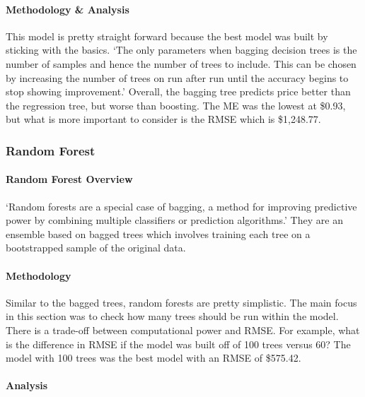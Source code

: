 \documentclass[
  paper=a4,
  ,captions=tableheading
]{scrartcl}
\begin{document}
\hypertarget{methodology-analysis}{%
\paragraph{Methodology \& Analysis}\label{methodology-analysis}}

This model is pretty straight forward because the best model was built
by sticking with the basics. `The only parameters when bagging decision
trees is the number of samples and hence the number of trees to include.
This can be chosen by increasing the number of trees on run after run
until the accuracy begins to stop showing improvement.' Overall, the
bagging tree predicts price better than the regression tree, but worse
than boosting. The ME was the lowest at \$0.93, but what is more
important to consider is the RMSE which is \$1,248.77.

\hypertarget{random-forest}{%
\subsubsection{Random Forest}\label{random-forest}}

\hypertarget{random-forest-overview}{%
\paragraph{Random Forest Overview}\label{random-forest-overview}}

`Random forests are a special case of bagging, a method for improving
predictive power by combining multiple classifiers or prediction
algorithms.' They are an ensemble based on bagged trees which involves
training each tree on a bootstrapped sample of the original data.

\hypertarget{methodology-2}{%
\paragraph{Methodology}\label{methodology-2}}

Similar to the bagged trees, random forests are pretty simplistic. The
main focus in this section was to check how many trees should be run
within the model. There is a trade-off between computational power and
RMSE. For example, what is the difference in RMSE if the model was built
off of 100 trees versus 60? The model with 100 trees was the best model
with an RMSE of \$575.42.

\hypertarget{analysis-2}{%
\paragraph{Analysis}\label{analysis-2}}
\end{document}
